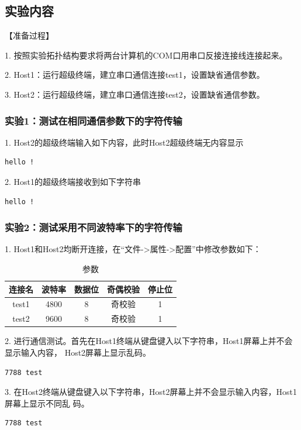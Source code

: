 \documentclass[lang=cn,11pt,a4paper,cite=authoryear]{elegantpaper}
\begin{document}
\subsection{实验内容}

【准备过程】

1. 按照实验拓扑结构要求将两台计算机的COM口用串口反接连接线连接起来。

2. Host1：运行超级终端，建立串口通信连接test1，设置缺省通信参数。

3. Host2：运行超级终端，建立串口通信连接test2，设置缺省通信参数。

\subsubsection{实验1：测试在相同通信参数下的字符传输}

1. Host2的超级终端输入如下内容，此时Host2超级终端无内容显示

\begin{lstlisting}
hello !
\end{lstlisting}

2. Host1的超级终端接收到如下字符串

\begin{lstlisting}
hello !
\end{lstlisting}

\subsubsection{实验2：测试采用不同波特率下的字符传输}

1. Host1和Host2均断开连接，在“文件->属性->配置”中修改参数如下：
\begin{table}[htbp]
	\centering
\begin{tabular}{|c|c|c|c|c|}
	\hline 连接名 & 波特率 & 数据位 & 奇偶校验 & 停止位 \\
	\hline test1 & 4800 & 8 & 奇校验 & 1 \\
	\hline test2 & 9600 & 8 & 奇校验 & 1 \\
	\hline
\end{tabular}
\caption{参数}
\end{table}

2. 进行通信测试。首先在Host1终端从键盘键入以下字符串，Host1屏幕上并不会显示输入内容，
Host2屏幕上显示乱码。

\begin{lstlisting}
7788 test
\end{lstlisting}

3. 在Host2终端从键盘键入以下字符串，Host2屏幕上并不会显示输入内容，Host1屏幕上显示不同乱
码。
\begin{lstlisting}
7788 test
\end{lstlisting}
\end{document}
